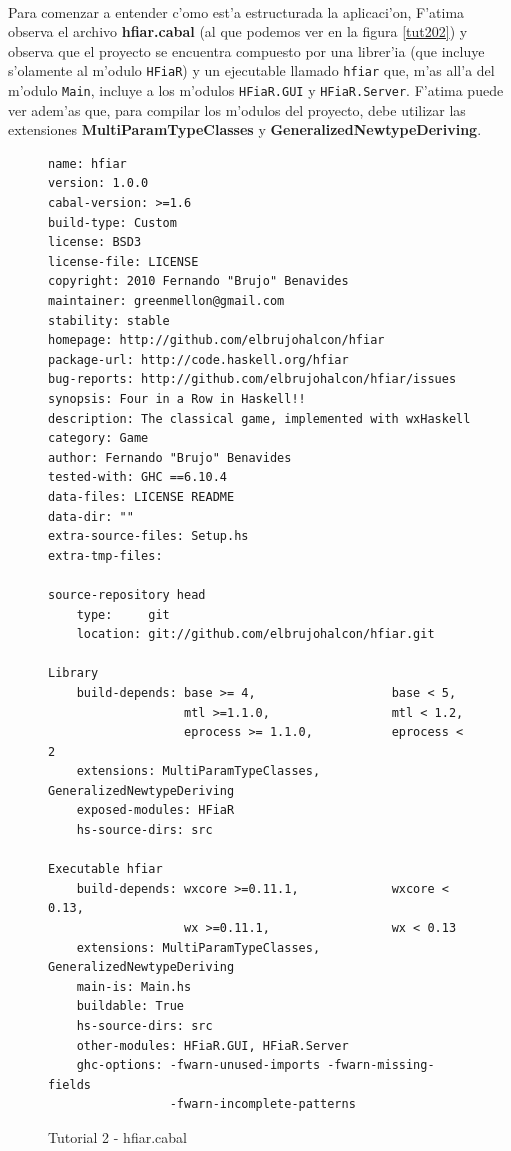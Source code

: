 \documentclass[a4paper]{article}
\begin{document}
\paragraph{}Para comenzar a entender c'omo est'a estructurada la aplicaci'on, F'atima observa el archivo \textbf{hfiar.cabal} (al que podemos ver en la figura \ref{tut202}) y observa que el proyecto se encuentra compuesto por una librer'ia (que incluye s'olamente al m'odulo \texttt{HFiaR}) y un ejecutable llamado \texttt{hfiar} que, m'as all'a del m'odulo \texttt{Main}, incluye a los m'odulos \texttt{HFiaR.GUI} y \texttt{HFiaR.Server}.  F'atima puede ver adem'as que, para compilar los m'odulos del proyecto, debe utilizar las extensiones \textbf{MultiParamTypeClasses} y \textbf{GeneralizedNewtypeDeriving}.
\begin{figure}[hp]
	\begin{center}
	\hbox{}
		\begin{center}\begin{lstlisting}
name: hfiar
version: 1.0.0
cabal-version: >=1.6
build-type: Custom
license: BSD3
license-file: LICENSE
copyright: 2010 Fernando "Brujo" Benavides
maintainer: greenmellon@gmail.com
stability: stable
homepage: http://github.com/elbrujohalcon/hfiar
package-url: http://code.haskell.org/hfiar
bug-reports: http://github.com/elbrujohalcon/hfiar/issues
synopsis: Four in a Row in Haskell!!
description: The classical game, implemented with wxHaskell
category: Game
author: Fernando "Brujo" Benavides
tested-with: GHC ==6.10.4
data-files: LICENSE README
data-dir: ""
extra-source-files: Setup.hs
extra-tmp-files:

source-repository head
    type:     git
    location: git://github.com/elbrujohalcon/hfiar.git

Library
    build-depends: base >= 4,                   base < 5,
                   mtl >=1.1.0,                 mtl < 1.2,
                   eprocess >= 1.1.0,           eprocess < 2
    extensions: MultiParamTypeClasses, GeneralizedNewtypeDeriving
    exposed-modules: HFiaR
    hs-source-dirs: src

Executable hfiar
    build-depends: wxcore >=0.11.1,             wxcore < 0.13,
                   wx >=0.11.1,                 wx < 0.13
    extensions: MultiParamTypeClasses, GeneralizedNewtypeDeriving
    main-is: Main.hs
    buildable: True
    hs-source-dirs: src
    other-modules: HFiaR.GUI, HFiaR.Server
    ghc-options: -fwarn-unused-imports -fwarn-missing-fields
                 -fwarn-incomplete-patterns
		\end{lstlisting}\end{center}
		\caption{Tutorial 2 - hfiar.cabal}
		\label{tut201}
	\end{center}
\end{figure}
\end{document}
